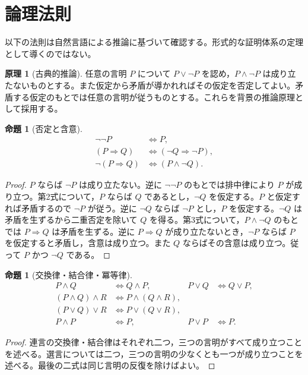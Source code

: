 \documentclass[a5paper,10pt,dvipdfmx]{jsarticle}
\theoremstyle{definition}
\newtheorem{principle}[ruledef]{原理}
\theoremstyle{plain}
\newtheorem{prop}[ruledef]{命題}
\newcommand{\iffc}{\Longleftrightarrow}
\begin{document}
\section{論理法則}
以下の法則は自然言語による推論に基づいて確認する。形式的な証明体系の定理として導くのではない。
\begin{principle}[古典的推論]
任意の言明 $P$ について $P\lor\neg P$ を認め，$P\land\neg P$ は成り立たないものとする。また仮定から矛盾が導かれればその仮定を否定してよい。矛盾する仮定のもとでは任意の言明が従うものとする。これらを背景の推論原理として採用する。
\end{principle}
\begin{prop}[否定と含意]
\begin{align*}
\neg\neg P&\iffc P,\\
(P\Rightarrow Q)&\iffc(\neg Q\Rightarrow\neg P),\\
\neg(P\Rightarrow Q)&\iffc(P\land\neg Q).
\end{align*}
\end{prop}
\begin{proof}
$P$ ならば $\neg P$ は成り立たない。逆に $\neg\neg P$ のもとでは排中律により $P$ が成り立つ。第2式について，$P$ ならば $Q$ であるとし，$\neg Q$ を仮定する。$P$ と仮定すれば矛盾するので $\neg P$ が従う。逆に $\neg Q$ ならば $\neg P$ とし，$P$ を仮定する。$\neg Q$ は矛盾を生ずるから二重否定を除いて $Q$ を得る。第3式について，$P\land\neg Q$ のもとでは $P\Rightarrow Q$ は矛盾を生ずる。逆に $P\Rightarrow Q$ が成り立たないとき，$\neg P$ ならば $P$ を仮定すると矛盾し，含意は成り立つ。また $Q$ ならばその含意は成り立つ。従って $P$ かつ $\neg Q$ である。
\end{proof}
\begin{prop}[交換律・結合律・冪等律]
\begin{align*}
P\land Q&\iffc Q\land P,& P\lor Q&\iffc Q\lor P,\\
(P\land Q)\land R&\iffc P\land(Q\land R),\\
(P\lor Q)\lor R&\iffc P\lor(Q\lor R),\\
P\land P&\iffc P,&P\lor P&\iffc P.
\end{align*}
\end{prop}
\begin{proof}
連言の交換律・結合律はそれぞれ二つ，三つの言明がすべて成り立つことを述べる。選言については二つ，三つの言明の少なくとも一つが成り立つことを述べる。最後の二式は同じ言明の反復を除けばよい。
\end{proof}
\end{document}
